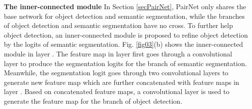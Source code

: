 \documentclass[10pt,twocolumn,letterpaper]{article}
\begin{document}
\textbf{The inner-connected module} In Section \ref{secPairNet}, PairNet only shares the base network for object detection and semantic segmentation, while the branches of object detection and semantic segmentation have no cross. To further help object detection, an inner-connected module is proposed to refine object detection by the logits of semantic segmentation.  Fig. \ref{fig03}(b) shows the inner-connected module in layer . The feature map in layer  first goes through a  convolutional layer to produce the segmentation logits for the branch of semantic segmentation. Meanwhile, the segmentation logit goes through two  convolutional layers to generate new feature map which are further concatenated with feature maps in layer . Based on concatenated feature maps, a  convolutional layer is used to generate the feature map for the branch of object detection. 
\end{document}

